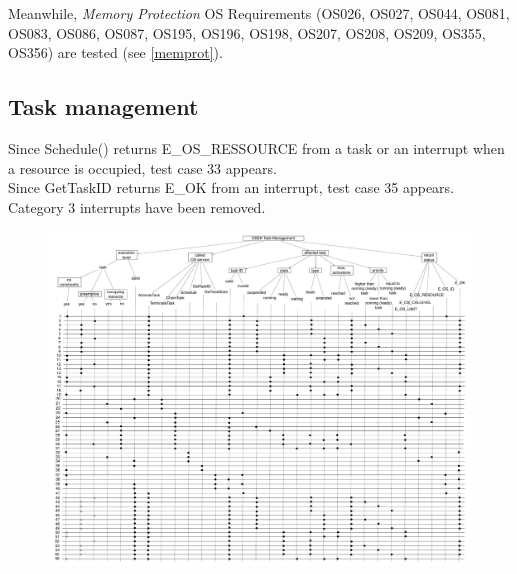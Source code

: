 \documentclass[10pt]{article}
\begin{document}
Meanwhile, \textit{Memory Protection} OS Requirements (OS026, OS027, OS044, OS081, OS083, OS086, OS087, OS195, OS196, OS198, OS207, OS208, OS209, OS355, OS356) are tested (see  \ref{memprot}).\\

	\subsection{Task management}
	Since Schedule() returns E\_OS\_RESSOURCE from a task or an interrupt when a resource is occupied, test case 33 appears.\\
	Since GetTaskID returns E\_OK from an interrupt, test case 35 appears.\\
	Category 3 interrupts have been removed. \\

	\begin{figure}[htbp] %
   		\centering
		\includegraphics[width=1\textheight, angle=90]{graphics/OSEK_Task_Management.pdf}
	\end{figure}		
	
\end{document}
